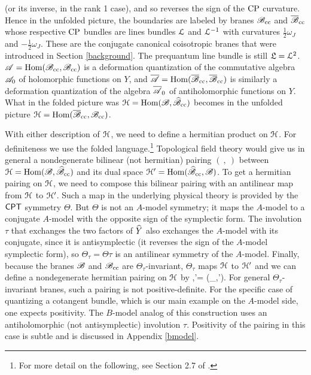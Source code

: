 \documentclass[11pt,a4paper]{article}
\begin{document}
 (or its inverse, in the rank 1 case), and so reverses the sign of the ${\mathrm{CP}}$ curvature.   Hence in the unfolded picture, the boundaries are labeled
 by branes ${\mathscr B}_{\mathrm{cc}}$ and ${\overline {\mathscr B}}_{\mathrm{cc}}$ whose respective ${\mathrm{CP}}$ bundles are lines bundles ${\mathcal L}$ and ${\mathcal L}^{-1}$ with curvatures
  $\frac{1}{2}\omega_J$ and $-\frac{1}{2}\omega_J$.   These are
 the conjugate canonical coisotropic branes that were introduced in Section \ref{background}.  The prequantum line bundle
is still ${{\mathfrak L}}={\mathcal L}^2$. 
   ${\mathscr A}={\mathrm{Hom}}({\mathscr B}_{\mathrm{cc}},{\mathscr B}_{\mathrm{cc}})$ is a deformation
 quantization of the commutative algebra ${\mathscr A}_0$ of holomorphic functions on $Y$, and $\overline{{\mathscr A}}={\mathrm{Hom}}({\overline {\mathscr B}}_{\mathrm{cc}},{\overline {\mathscr B}}_{\mathrm{cc}})$ is similarly a deformation
 quantization of the algebra $\overline{\mathscr A}_0$ of antiholomorphic functions on $Y$.    What in the folded picture was ${\mathcal H}={\mathrm{Hom}}({\mathscr B},\widehat{{\mathscr B}}_{\mathrm{cc}})$ becomes in the
 unfolded picture ${\mathcal H}={\mathrm{Hom}}(\overline{{\mathscr B}}_{\mathrm{cc}},{\mathscr B}_{\mathrm{cc}})$.    
 

 
 With either description of ${\mathcal H}$, we need to define a hermitian product on ${\mathcal H}$.     For definiteness
 we use the folded language.\footnote{For more detail on the following, see Section 2.7 of \cite{GW}.}    Topological
 field theory would give us in general  a nondegenerate bilinear (not hermitian) pairing $(~,~)$ between ${\mathcal H}={\mathrm{Hom}}({\mathscr B},\widehat{{\mathscr B}}_{\mathrm{cc}})$ and its dual space
 ${\mathcal H}'={\mathrm{Hom}}(\widehat{{\mathscr B}}_{\mathrm{cc}},{\mathscr B})$.     To get a hermitian pairing on ${\mathcal H}$, we need to compose this bilinear pairing with an antilinear map from ${\mathcal H}$ to ${\mathcal H}'$.
 Such a map in the underlying physical theory is provided by the $\sf{CPT}$ symmetry $\Theta$.   But $\Theta$ is not an $A$-model symmetry;
 it maps the $A$-model to a conjugate $A$-model with the opposite sign of the symplectic form.   The  involution $\tau$ that exchanges the two factors
 of $\widehat Y$
 also exchanges the $A$-model with its conjugate, since it is antisymplectic 
 (it reverses the sign of the $A$-model symplectic form), so $\Theta_\tau=\Theta\tau$ is an antilinear symmetry
 of the $A$-model.   Finally, because the branes ${\mathscr B}$ and ${\mathscr B}_{\mathrm{cc}}$ are $\Theta_\tau$-invariant, $\Theta_\tau$ maps ${\mathcal H}$ to ${\mathcal H}'$ and
 we can define a nondegenerate hermitian pairing on ${\mathcal H}$ by 
 \be\label{hermdef}\la \psi,\psi'\ra= (\Theta_\tau\psi,\psi').\ee   
For  general $\Theta_\tau$-invariant branes,  
such a pairing is not positive-definite.   For the specific case of quantizing a cotangent bundle, which is our main example on the $A$-model
 side, one expects positivity.   The $B$-model analog of this construction uses an antiholomorphic (not antisymplectic) involution $\tau$.  
 Positivity of the pairing in this case is subtle and is discussed in Appendix \ref{bmodel}.    
 
\end{document}
